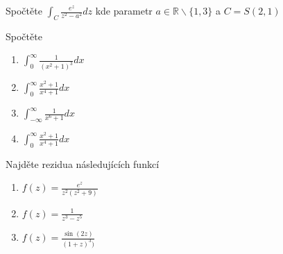 \begin{multicols}{2}
Spočtěte $\int_C \frac{e^z}{z^2 - a^2} dz$ kde parametr $a \in \mathbb{R} \backslash \{ 1, 3 \}$ a $C = S(2,1)$

\separator

Spočtěte
\begin{enumerate}
\item $\int_0^\infty \frac{1}{(x^2 + 1)^3} dx$
\item $\int_0^\infty \frac{x^2 + 1}{x^4 + 1} dx$
\item $\int_{-\infty}^\infty \frac{1}{x^6 + 1} dx$
\item $\int_0^\infty \frac{x^2 + 1}{x^4 + 1} dx$
\end{enumerate}
 
\separator

Najděte rezidua následujících funkcí
\begin{enumerate}
\item $f(z) = \frac{e^z}{z^2 (z^2 + 9)}$
\item $f(z) = \frac{1}{z^3 - z^5}$
\item $f(z) = \frac{\sin (2z)}{(1+z)^3)}$
\end{enumerate}

\end{multicols}
